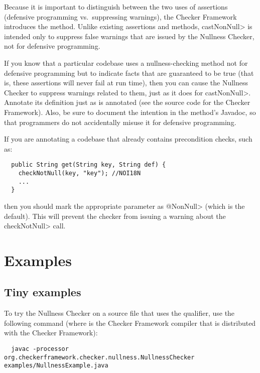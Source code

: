 Because it is important to distinguish between the two uses of assertions
(defensive programming vs.~suppressing warnings), the Checker Framework
introduces the  method.
Unlike existing assertions and
methods, \<castNonNull> is intended only to suppress false warnings that are
issued by the Nullness Checker, not for defensive programming.

If you know that a particular codebase uses
a nullness-checking method not for defensive programming but to indicate
facts that are guaranteed to be true (that is, these assertions will never
fail at run time), then you can cause the Nullness Checker to suppress
warnings related to them, just as it does for \<castNonNull>.
Annotate its definition just as
 is annotated (see the
source code for the Checker Framework).
Also, be sure to document the intention in the method's Javadoc, so that
programmers do not
accidentally misuse it for defensive programming.


If you are annotating a codebase that already contains precondition checks,
such as:

\begin{Verbatim}
  public String get(String key, String def) {
    checkNotNull(key, "key"); //NOI18N
    ...
  }
\end{Verbatim}

\noindent
then you should mark the appropriate parameter as \<@NonNull> (which is the
default).  This will prevent the checker from issuing a warning about the
\<checkNotNull> call.


\section{Examples\label{nullness-example}}

\subsection{Tiny examples\label{nullness-tiny-examples}}

To try the Nullness Checker on a source file that uses the  qualifier,
use the following command (where  is the Checker Framework compiler that
is distributed with the Checker Framework):

\begin{Verbatim}
  javac -processor org.checkerframework.checker.nullness.NullnessChecker examples/NullnessExample.java
\end{Verbatim}

